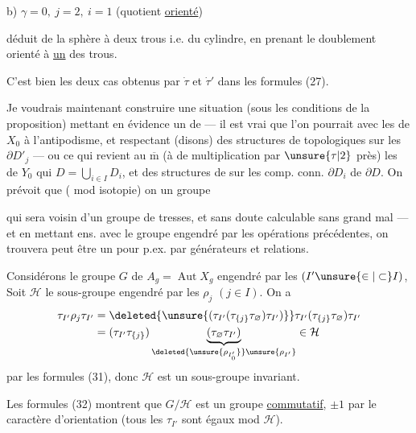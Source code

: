 b) $\gamma=0,\ j=2,\ i=1$ (quotient \uline{orienté})

déduit de la sphère à deux trous i.e. du cylindre, en prenant le doublement orienté  à \uline{un} des trous. 

C'est bien les deux cas obtenus  par $\dot\tau$ et $\dot\tau'$ dans les formules (27).

Je voudrais maintenant construire une situation (sous les conditions de la proposition) mettant en évidence un  de  --- il est vrai que l'on pourrait  avec  les  de $X_0$  à l'antipodisme\inserted{$\tau$},  et respectant (disons) des structures de  topologiques sur les $\partial D'_j$ --- ou ce qui revient  au $\overline{\mathrm m}$ (à  de multiplication par $\unsure{\tau|2}$ près) les  de $Y_0$ qui   $D=\bigcup_{i\in I}D_i$, et  des structures de  sur  les comp. conn. $\partial D_i$ de $\partial D$. On prévoit que ( mod isotopie) on  un groupe



qui sera voisin d'un groupe de tresses, et sans doute calculable sans grand mal --- et en  mettant ens. avec le groupe engendré par les opérations précédentes, on trouvera peut être un  pour  p.ex.  par générateurs  et relations.

Considérons le  groupe $G$ de $A_g=\operatorname{Aut}X_g$ engendré par les  $(I'\unsure{\in|\subset} I)$,  Soit $\mathcal H$  le sous-groupe engendré par les $\rho_j$ $(j\in I)$. On a
\[
\begin{aligned}
\tau_{I'}\rho_j\tau_{I'}
&=\deleted{\unsure{(\tau_{I'}(\tau_{\{j\}}\tau_{\varnothing})\tau_{I'})}}
\tau_{I'}(\tau_{\{j\}}\tau_{\varnothing})\tau_{I'}\\
&=(\tau_{I'}\tau_{\{j\}})
\underbrace{(\tau_{\varnothing}\tau_{I'})}_{\deleted{\unsure{\rho_{I'_0}}}\unsure{\rho_{I'}}}
\in\mathcal H
\end{aligned}
\]
par les formules (31), donc $\mathcal H$ est un sous-groupe invariant.

Les formules (32) montrent que $G/\mathcal H$ est un groupe \uline{commutatif},  $\pm1$ par le caractère d'orientation (tous les $\tau_{I'}$ sont égaux mod $\mathcal H$).
